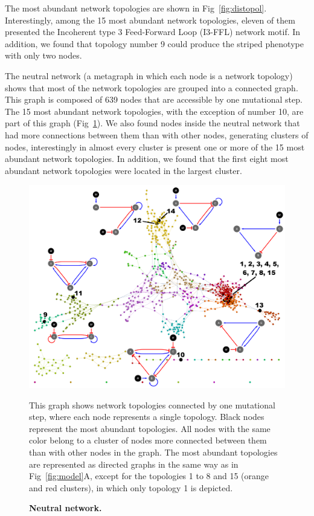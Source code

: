 \documentclass[10pt,letterpaper]{article}
\begin{document}
The most abundant network topologies are shown in Fig~\ref{fig:distopol}.
Interestingly, among the 15 most abundant network topologies, eleven of them
presented the Incoherent type 3 Feed-Forward Loop (I3-FFL) network motif. In
addition, we found that topology number 9 could produce the striped phenotype
with only two nodes.

The neutral network (a metagraph in which each node is a network topology)
shows that most of the network topologies are grouped into a connected graph.
This graph is composed of 639 nodes that are accessible by one mutational step.
The 15 most abundant network topologies, with the exception of
number 10, are part of this graph (Fig~\ref{fig:neutral-network}). We also
found nodes inside the neutral network that had more connections between them
than with other nodes, generating clusters of nodes, interestingly in
almost every cluster is present one or more of the 15 most abundant network
topologies. In addition, we found that the first eight most abundant network
topologies were located in the largest cluster.

\begin{figure}[!h]
 \includegraphics[width=\textwidth]{figures/results/Fig3}
 \caption{\bf Neutral network.}
 This graph shows network topologies connected by one mutational step, where
 each node represents a single topology. Black nodes represent the most
 abundant topologies. All nodes with the same
 color belong to a cluster of nodes more connected between them than with other
 nodes in the graph. The most abundant topologies are represented as
 directed graphs in the same way as in Fig~\ref{fig:model}A, except for
 the topologies 1 to 8 and 15 (orange and red clusters), in which only
 topology 1 is depicted.
 \label{fig:neutral-network}
\end{figure}
\end{document}
